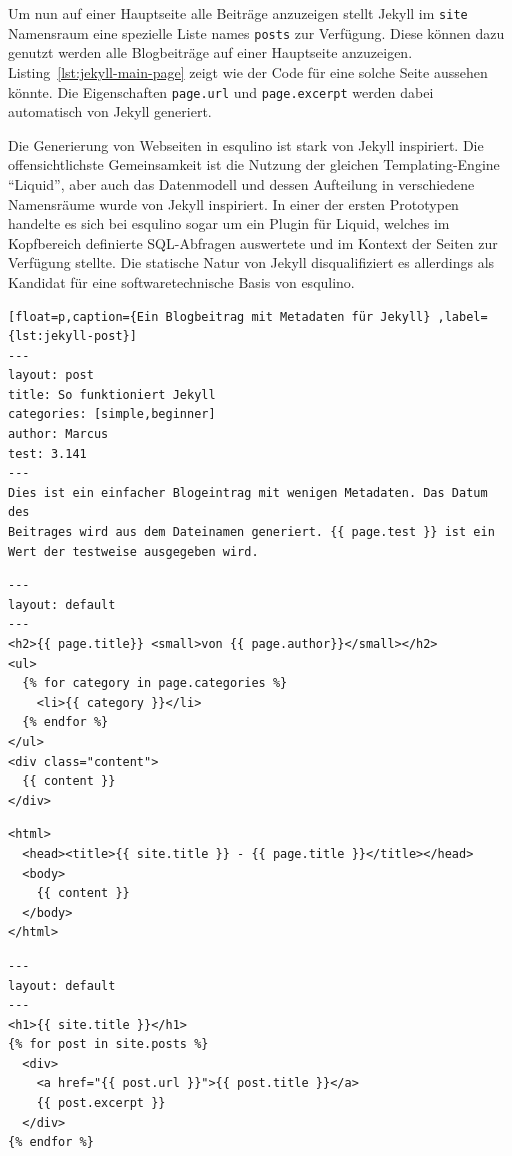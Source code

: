 Um nun auf einer Hauptseite alle Beiträge anzuzeigen stellt Jekyll im \lstinline{site} Namensraum eine spezielle Liste names \lstinline{posts} zur Verfügung. Diese können dazu genutzt werden alle Blogbeiträge auf einer Hauptseite anzuzeigen. Listing~\ref{lst:jekyll-main-page} zeigt wie der Code für eine solche Seite aussehen könnte. Die Eigenschaften \lstinline|page.url| und \lstinline|page.excerpt| werden dabei automatisch von Jekyll generiert.

Die Generierung von Webseiten in esqulino ist stark von Jekyll inspiriert. Die offensichtlichste Gemeinsamkeit ist die Nutzung der gleichen Templating-Engine "`Liquid"', aber auch das Datenmodell und dessen Aufteilung in verschiedene Namensräume wurde von Jekyll inspiriert. In einer der ersten Prototypen handelte es sich bei esqulino sogar um ein Plugin für Liquid, welches im Kopfbereich definierte SQL-Abfragen auswertete und im Kontext der Seiten zur Verfügung stellte. Die statische Natur von Jekyll disqualifiziert es allerdings als Kandidat für eine softwaretechnische Basis von esqulino.

\begin{lstlisting}[float=p,caption={Ein Blogbeitrag mit Metadaten für Jekyll} ,label={lst:jekyll-post}]
---
layout: post
title: So funktioniert Jekyll
categories: [simple,beginner]
author: Marcus
test: 3.141
---
Dies ist ein einfacher Blogeintrag mit wenigen Metadaten. Das Datum des
Beitrages wird aus dem Dateinamen generiert. {{ page.test }} ist ein
Wert der testweise ausgegeben wird.
\end{lstlisting}

\begin{lstlisting}[float=p,caption={Beispieltemplate für Blogbeiträge für Jekyll}, label={lst:jekyll-post-template}]
---
layout: default
---
<h2>{{ page.title}} <small>von {{ page.author}}</small></h2>
<ul>
  {% for category in page.categories %}
    <li>{{ category }}</li>
  {% endfor %}
</ul>
<div class="content">
  {{ content }}
</div>
\end{lstlisting}

\begin{lstlisting}[float=p,caption={Template mit HTML-Rumpf für Jekyll}, label={lst:jekyll-master-template}]
<html>
  <head><title>{{ site.title }} - {{ page.title }}</title></head>
  <body>
    {{ content }}
  </body>
</html>
\end{lstlisting}

\begin{lstlisting}[float=p,caption={Hauptseite mit Auszügen aller Beiträge für Jekyll}, label={lst:jekyll-main-page}]
---
layout: default
---
<h1>{{ site.title }}</h1>
{% for post in site.posts %}
  <div>
    <a href="{{ post.url }}">{{ post.title }}</a>
    {{ post.excerpt }}
  </div>
{% endfor %}
\end{lstlisting}

